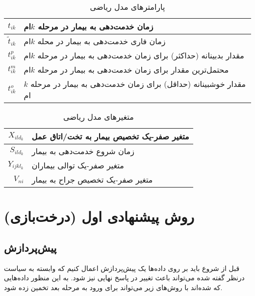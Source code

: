 	\begin{table}[ht]
		\caption{پارامترهای مدل ریاضی}
		\label{tab:modelParameters}
		\centering
		\onehalfspacing
		\begin{tabularx}{0.9\textwidth}{|r|X|}
			\hline
			$t_{ik}$			& زمان خدمت‌دهی به بیمار در مرحله $k$ام \\
			\hline
			$\tilde{t}_{ik}$	& زمان فاری خدمت‌دهی به بیمار در محله $k$ام \\
			\hline
			$t_{ik}^p$			& مقدار بدبینانه (حداکثر) برای زمان خدمت‌دهی به بیمار در مرحله $k$ام \\
			\hline
			$t_{ik}^m$			& محتمل‌ترین مقدار برای زمان خدمت‌دهی به بیمار در مرحله $k$ام \\
			\hline
			$t_{ik}^o$			& مقدار خوشبینانه (حداقل) برای زمان خدمت‌دهی به بیمار در مرحله $k$ام \\
			\hline
		\end{tabularx}
	\end{table}
	
	\begin{table}[ht]
		\caption{متغیرهای مدل ریاضی}
		\label{tab:modelVariables}
		\centering
		\onehalfspacing
		\begin{tabularx}{0.9\textwidth}{|r|X|}
			\hline
			$X_{ild_{k}}$	& متغیر صفر-یک تخصیص بیمار به تخت/اتاق عمل\\
			\hline
			$S_{ild_{k}}$	& زمان شروع خدمت‌دهی به بیمار \\
			\hline
			$Y_{ijkl_{k}}$	& متغیر صفر-یک توالی بیماران \\
			\hline
			$V_{ni}$		& متغیر صفر-یک تخصیص جراح به بیمار‍‍ \\
			\hline
		\end{tabularx}
	\end{table}
	



\section{روش پیشنهادی اول (درخت‌بازی)}

\subsection{پیش‌پردازش}
قبل از شروع باید بر روی داده‌ها یک پیش‌پردازش اعمال کنیم که وابسته به سیاست درنظر گفته شده می‌تواند باعث تغییر در پاسخ نهایی نیز شود. به این منظور داده‌هایی که  شده‌اند با روش‌های زیر ‌می‌تواند برای ورود به مرحله بعد تخمین زده شود.
